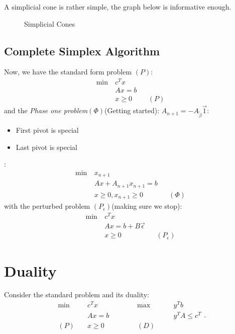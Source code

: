 A simplicial cone is rather simple, the graph below is informative enough.
\begin{figure}[H]
	\centering
	\caption{Simplicial Cones}
	\label{fig:simplicial-cones}
\end{figure}

\section{Complete Simplex Algorithm}
Now, we have the standard form problem \((P)\):
\begin{align*}
	\min~ & c^Tx             \\
	      & Ax = b           \\
	      & x\geq 0 &  & (P)
\end{align*}
and the \emph{Phase one problem}\((\Phi)\)(Getting started):
\(A_{n+1} = -A_{\widetilde{\beta}}\vec{1}\):
\begin{itemize}
	\item First pivot is special
	\item Last pivot is special
\end{itemize}:
\begin{align*}
	\min~ & x_{n+1}                            \\
	      & Ax +A_{n+1} x_{n+1}= b             \\
	      & x\geq 0, x_{n+1}\geq 0 &  & (\Phi)
\end{align*}
with the perturbed problem \((P_{\epsilon})\)(making sure we stop):
\begin{align*}
	\min~ & c^Tx                                          \\
	      & Ax = b + B \vec{\epsilon}                     \\
	      & x\geq 0                   &  & (P_{\epsilon})
\end{align*}

\chapter{Duality}
Consider the standard problem and its duality:
\[
	\begin{alignedat}{5}
		\min~&c^{T}x\qquad\qquad &&\max ~ &&y^{T}b\\
		&Ax = b && &&y^{T}A\leq c^{T}\\
		(P)\quad&x\geq  0 &&(D)\quad&&
	\end{alignedat}.
\]

